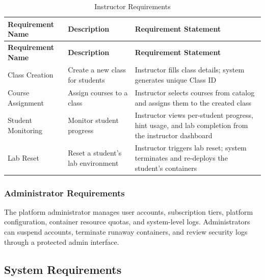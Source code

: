 \documentclass[12pt,a4paper]{report}
\newcommand{\hrow}{}
\newcommand{\hcell}[1]{\textbf{#1}}
\newcommand{\altrow}{}
\begin{document}
\begin{longtable}{|L{3cm}|L{4cm}|L{7cm}|}
\caption{Instructor Requirements}\label{tab:instructor-req}\\
\hline
\hrow \hcell{Requirement Name} & \hcell{Description} & \hcell{Requirement Statement} \\
\hline
\endfirsthead
\hline
\hrow \hcell{Requirement Name} & \hcell{Description} & \hcell{Requirement Statement} \\
\hline
\endhead
Class Creation & Create a new class for students & Instructor fills class details; system generates unique Class ID \\\hline
\altrow Course Assignment & Assign courses to a class & Instructor selects courses from catalog and assigns them to the created class \\\hline
Student Monitoring & Monitor student progress & Instructor views per-student progress, hint usage, and lab completion from the instructor dashboard \\\hline
\altrow Lab Reset & Reset a student's lab environment & Instructor triggers lab reset; system terminates and re-deploys the student's containers \\\hline
\end{longtable}

\subsubsection{Administrator Requirements}

The platform administrator manages user accounts, subscription tiers, platform configuration, container
resource quotas, and system-level logs. Administrators can suspend accounts, terminate runaway
containers, and review security logs through a protected admin interface.

\subsection{System Requirements}
\end{document}
